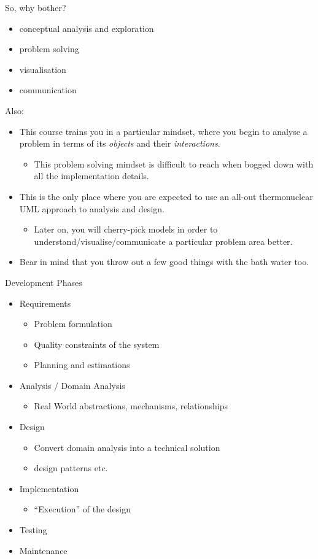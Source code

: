 \documentclass[10pt,t,a4paper]{beamer}
\begin{document}
\begin{frame}[label=sec-9]{So, why bother?}
\begin{itemize}
\item conceptual analysis and exploration
\item problem solving
\item visualisation
\item communication
\end{itemize}

Also:
\begin{itemize}
\item This course trains you in a particular mindset, where you begin to analyse a problem in terms of its \emph{objects} and their \emph{interactions}.
\begin{itemize}
\item This problem solving mindset is difficult to reach when bogged down with all the implementation details.
\end{itemize}
\item This is the only place where you are expected to use an all-out thermonuclear UML approach to analysis and design.
\begin{itemize}
\item Later on, you will cherry-pick models in order to understand/visualise/communicate a particular problem area better.
\end{itemize}
\item Bear in mind that you throw out a few good things with the bath water too.
\end{itemize}
\end{frame}
\begin{frame}[label=sec-10]{Development Phases}
\begin{itemize}
\item Requirements
\begin{itemize}
\item Problem formulation
\item Quality constraints of the system
\item Planning and estimations
\end{itemize}
\item Analysis / Domain Analysis
\begin{itemize}
\item Real World abstractions, mechanisms, relationships
\end{itemize}
\item Design
\begin{itemize}
\item Convert domain analysis into a technical solution
\item design patterns etc.
\end{itemize}
\item Implementation
\begin{itemize}
\item ``Execution'' of the design
\end{itemize}
\item Testing
\item Maintenance
\end{itemize}
\end{frame}
\end{document}
